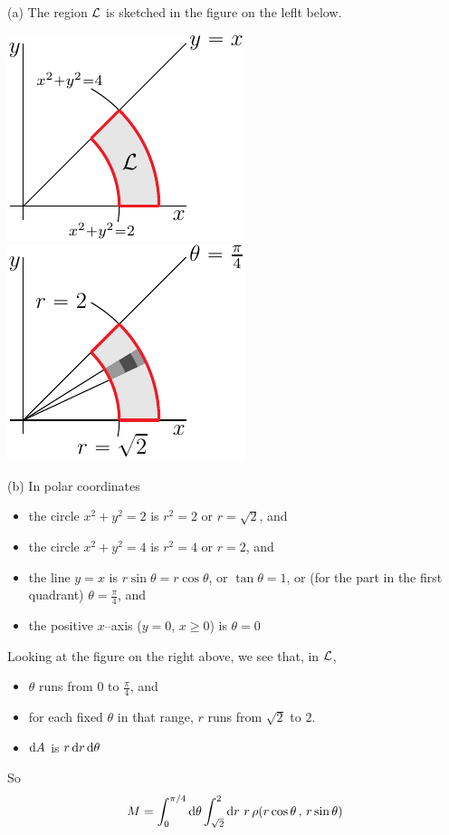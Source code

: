\begin{solution}
(a) The region $\mathcal{L}$ is sketched in the figure on the leflt below.
\begin{center}
     \includegraphics{fig/OE06D_5.pdf}\qquad
     \includegraphics{fig/OE06D_5p.pdf}
\end{center}

(b) In polar coordinates
\begin{itemize}
\item
the circle $x^2+y^2=2$ is $r^2=2$ or $r=\sqrt{2}$, and
\item
the circle $x^2+y^2=4$ is $r^2=4$ or $r=2$, and
\item
the line $y=x$ is $r\sin\theta = r\cos\theta$, or $\tan\theta =1 $,
or (for the part in the first quadrant) $\theta=\frac{\pi}{4}$, and
\item 
the positive $x$--axis ($y=0$, $x\ge 0$) is $\theta=0$ 
\end{itemize}
Looking at the figure on the right above, we see that, in $\mathcal{L}$,
\begin{itemize}
\item 
$\theta$ runs from $0$ to $\frac{\pi}{4}$, and
\item
for each fixed $\theta$ in that range, $r$ runs from $\sqrt{2}$
to $2$.
\item
$\mathrm{d}A$ is $r\,\mathrm{d}r\,\mathrm{d}\theta$
\end{itemize}
So
\begin{align*}
M = \int_0^{\pi/4}\mathrm{d}\theta\int_{\sqrt{2}}^2\mathrm{d}r\ r\,
         \rho(r\cos\theta\,,\,r\sin\theta)
\end{align*}


\end{solution}
